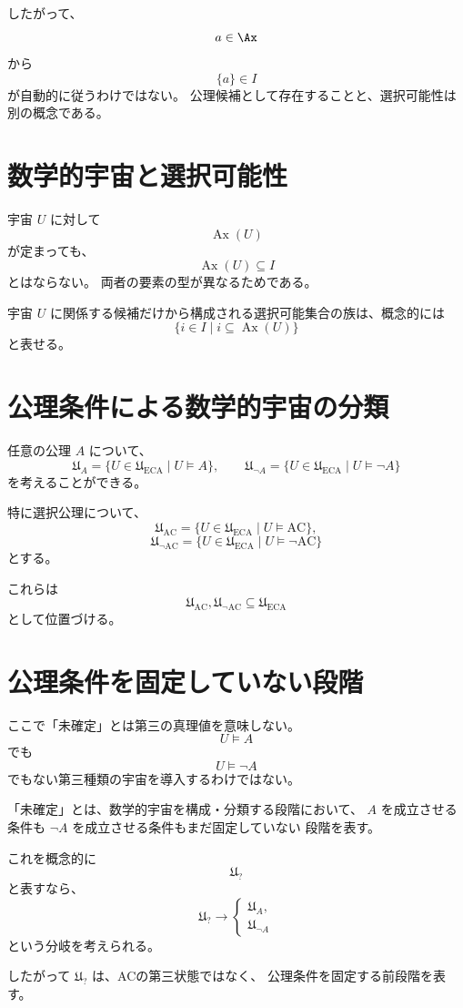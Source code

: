 \documentclass[11pt,a4paper]{article}
\begin{document}
したがって、
\[
a\in\Ax
\]
から
\[
\{a\}\in I
\]
が自動的に従うわけではない。
公理候補として存在することと、選択可能性は別の概念である。

\section{数学的宇宙と選択可能性}
宇宙 \(U\) に対して
\[
\operatorname{Ax}(U)
\]
が定まっても、
\[
\operatorname{Ax}(U)\subseteq I
\]
とはならない。
両者の要素の型が異なるためである。

宇宙 \(U\) に関係する候補だけから構成される選択可能集合の族は、概念的には
\[
\{i\in I\mid i\subseteq\operatorname{Ax}(U)\}
\]
と表せる。

\section{公理条件による数学的宇宙の分類}
任意の公理 \(A\) について、
\[
\mathfrak U_A
=
\{U\in\mathfrak U_{\mathrm{ECA}}\mid U\models A\},
\qquad
\mathfrak U_{\neg A}
=
\{U\in\mathfrak U_{\mathrm{ECA}}\mid U\models\neg A\}
\]
を考えることができる。

特に選択公理について、
\[
\mathfrak U_{\mathrm{AC}}
=
\{U\in\mathfrak U_{\mathrm{ECA}}\mid U\models\mathrm{AC}\},
\]
\[
\mathfrak U_{\neg\mathrm{AC}}
=
\{U\in\mathfrak U_{\mathrm{ECA}}\mid U\models\neg\mathrm{AC}\}
\]
とする。

これらは
\[
\mathfrak U_{\mathrm{AC}},
\mathfrak U_{\neg\mathrm{AC}}
\subseteq\mathfrak U_{\mathrm{ECA}}
\]
として位置づける。

\section{公理条件を固定していない段階}
ここで「未確定」とは第三の真理値を意味しない。
\[
U\models A
\]
でも
\[
U\models\neg A
\]
でもない第三種類の宇宙を導入するわけではない。

「未確定」とは、数学的宇宙を構成・分類する段階において、
\(A\) を成立させる条件も \(\neg A\) を成立させる条件もまだ固定していない
段階を表す。

これを概念的に
\[
\mathfrak U_{?}
\]
と表すなら、
\[
\boxed{
\mathfrak U_{?}
\longrightarrow
\begin{cases}
\mathfrak U_A,\\
\mathfrak U_{\neg A}
\end{cases}}
\]
という分岐を考えられる。

したがって \(\mathfrak U_?\) は、ACの第三状態ではなく、
公理条件を固定する前段階を表す。
\end{document}
